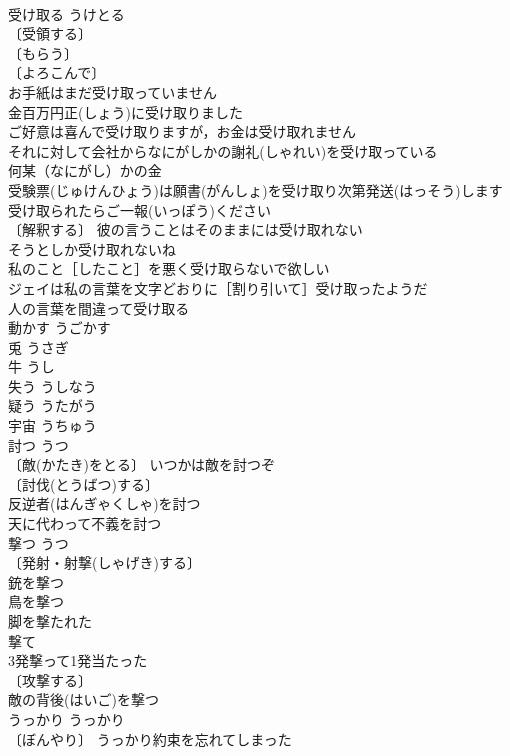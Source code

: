 \documentclass[8pt]{extreport}
\begin{document}
\begin{CJK}{UTF8}{min}
\\	受け取る	うけとる	
\\	〔受領する〕
\\	〔もらう〕
\\	〔よろこんで〕
\\	お手紙はまだ受け取っていません 
\\	金百万円正(しょう)に受け取りました 
\\	ご好意は喜んで受け取りますが，お金は受け取れません 
\\	それに対して会社からなにがしかの謝礼(しゃれい)を受け取っている 
\\	何某（なにがし）かの金 
\\	受験票(じゅけんひょう)は願書(がんしょ)を受け取り次第発送(はっそう)します 
\\	受け取られたらご一報(いっぽう)ください 
\\	〔解釈する〕 彼の言うことはそのままには受け取れない 
\\	そうとしか受け取れないね 
\\	私のこと［したこと］を悪く受け取らないで欲しい 
\\	ジェイは私の言葉を文字どおりに［割り引いて］受け取ったようだ 
\\	人の言葉を間違って受け取る 
\\	動かす	うごかす	
\\	兎	うさぎ	
\\	牛	うし	
\\	失う	うしなう	
\\	疑う	うたがう	
\\	宇宙	うちゅう	
\\	討つ	うつ	
\\	〔敵(かたき)をとる〕 いつかは敵を討つぞ 
\\	〔討伐(とうばつ)する〕
\\	反逆者(はんぎゃくしゃ)を討つ 
\\	天に代わって不義を討つ 
\\	撃つ	うつ	
\\	〔発射・射撃(しゃげき)する〕
\\	銃を撃つ 
\\	鳥を撃つ 
\\	脚を撃たれた 
\\	撃て 
\\	3発撃って1発当たった 
\\	〔攻撃する〕
\\	敵の背後(はいご)を撃つ 
\\	うっかり	うっかり	
\\	〔ぼんやり〕 うっかり約束を忘れてしまった 

\end{CJK}
\end{document}
